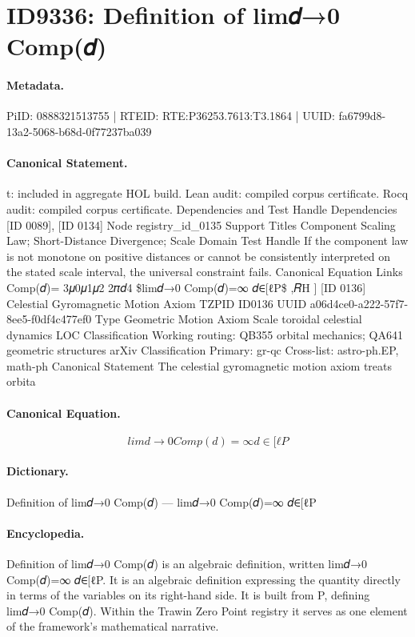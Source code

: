 \section*{ID9336: Definition of lim𝑑→0 Comp(𝑑)}
\paragraph{Metadata.}
PiID: 0888321513755 | RTEID: RTE:P36253.7613:T3.1864 | UUID: fa6799d8-13a2-5068-b68d-0f77237ba039

\paragraph{Canonical Statement.}
t: included in aggregate HOL build. Lean audit: compiled corpus certificate. Rocq audit: compiled corpus certificate. Dependencies and Test Handle Dependencies [ID 0089], [ID 0134] Node registry\_id\_0135 Support Titles Component Scaling Law; Short-Distance Divergence; Scale Domain Test Handle If the component law is not monotone on positive distances or cannot be consistently interpreted on the stated scale interval, the universal constraint fails. Canonical Equation Links Comp(𝑑)= 3𝜇0𝜇1𝜇2 2𝜋𝑑4 \$lim𝑑→0 Comp(𝑑)=∞ 𝑑∈[ℓP\$ ,𝑅H ] [ID 0136] Celestial Gyromagnetic Motion Axiom TZPID ID0136 UUID a06d4ce0-a222-57f7-8ee5-f0df4c477ef0 Type Geometric Motion Axiom Scale toroidal celestial dynamics LOC Classification Working routing: QB355 orbital mechanics; QA641 geometric structures arXiv Classification Primary: gr-qc Cross-list: astro-ph.EP, math-ph Canonical Statement The celestial gyromagnetic motion axiom treats orbita

\paragraph{Canonical Equation.}
\[
lim𝑑→0 Comp(𝑑)=∞ 𝑑∈[ℓP
\]

\paragraph{Dictionary.}
Definition of lim𝑑→0 Comp(𝑑) — lim𝑑→0 Comp(𝑑)=∞ 𝑑∈[ℓP

\paragraph{Encyclopedia.}
Definition of lim𝑑→0 Comp(𝑑) is an algebraic definition, written lim𝑑→0 Comp(𝑑)=∞ 𝑑∈[ℓP. It is an algebraic definition expressing the quantity directly in terms of the variables on its right-hand side. It is built from P, defining lim𝑑→0 Comp(𝑑). Within the Trawin Zero Point registry it serves as one element of the framework's mathematical narrative.
